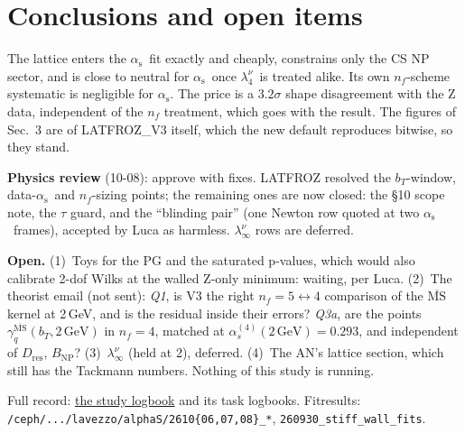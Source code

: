 \documentclass[10pt,a4paper]{article}
\makeatletter
\providecommand\SumViewPath{?}    %
\gdef\Sum@web{https://submit.mit.edu/~lavezzo/alphaS/studies/#}
\newcommand\logbooklink[1]{\href{\Sum@web\SumViewPath:logbook}{#1}}
\newcommand\code{\nolinkurl}
\newcommand\alphas{\ensuremath{\alpha_\mathrm{s}}}
\newcommand\lnu[1]{\ensuremath{\lambda_{#1}^{\nu}}}
\newcommand\fit[1]{\textsf{#1}}
\makeatother
\begin{document}
\section{Conclusions and open items}

The lattice enters the \alphas\ fit exactly and cheaply, constrains only the CS NP sector, and is close to neutral for
\alphas\ once \lnu4\ is treated alike. Its own $n_f$-scheme systematic is negligible for \alphas. The price is a
$3.2\sigma$ shape disagreement with the Z data, independent of the $n_f$ treatment, which goes with the result. The
figures of Sec.~3 are of \fit{LATFROZ\_V3} itself, which the new default reproduces bitwise, so they stand.

\textbf{Physics review} (10-08): approve with fixes. \fit{LATFROZ} resolved the $b_T$-window, data-\alphas\ and
$n_f$-sizing points; the remaining ones are now closed: the \S10 scope note, the $\tau$ guard, and the ``blinding pair''
(one Newton row quoted at two \alphas\ frames), accepted by Luca as harmless. $\lambda_\infty^\nu$ rows are deferred.

\textbf{Open.} (1)~Toys for the PG and the saturated p-values, which would also calibrate 2-dof Wilks at the walled
Z-only minimum: waiting, per Luca. (2)~The theorist email (not sent): \emph{Q1}, is V3 the right
$n_f=5\leftrightarrow4$ comparison of the $\overline{\mathrm{MS}}$ kernel at 2\,GeV, and is the residual inside their
errors? \emph{Q3a}, are the points $\gamma_q^{\overline{\mathrm{MS}}}(b_T,2\,\mathrm{GeV})$ in $n_f=4$, matched at
$\alpha_s^{(4)}(2\,\mathrm{GeV})=0.293$, and independent of $D_\mathrm{res}$, $B_\mathrm{NP}$? (3)~$\lambda_\infty^\nu$
(held at 2), deferred. (4)~The AN's lattice section, which still has the Tackmann numbers. Nothing of this study is
running.

{\footnotesize\color{sumgray} Full record: \logbooklink{the study logbook} and its task logbooks. Fitresults: \code{/ceph/.../lavezzo/alphaS/2610{06,07,08}_*}, \code{260930_stiff_wall_fits}.\par}
\end{document}

